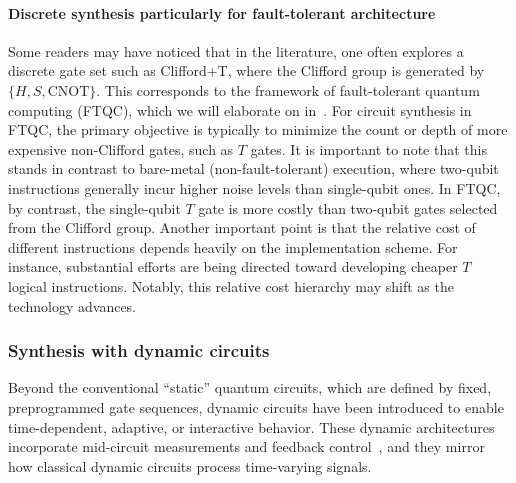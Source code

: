 \documentclass[a4paper,onecolumn,11pt,unpublished]{quantumarticle}
\begin{document}
\paragraph{Discrete synthesis particularly for fault-tolerant architecture}
Some readers may have noticed that in the literature, one often explores a discrete gate set such as Clifford+T, where the Clifford group is generated by $\{H, S, \text{CNOT}\}$. This corresponds to the framework of fault-tolerant quantum computing (FTQC), which we will elaborate on in~. For circuit synthesis in FTQC, the primary objective is typically to minimize the count or depth of more expensive non-Clifford gates, such as $T$ gates. It is important to note that this stands in contrast to bare-metal (non-fault-tolerant) execution, where two-qubit instructions generally incur higher noise levels than single-qubit ones. In FTQC, by contrast, the single-qubit $T$ gate is more costly than two-qubit gates selected from the Clifford group. Another important point is that the relative cost of different instructions depends heavily on the implementation scheme. For instance, substantial efforts are being directed toward developing cheaper $T$ logical instructions. Notably, this relative cost hierarchy may shift as the technology advances.

\subsubsection{Synthesis with dynamic circuits}

Beyond the conventional ``static'' quantum circuits, which are defined by fixed, preprogrammed gate sequences, dynamic circuits have been introduced to enable time-dependent, adaptive, or interactive behavior. These dynamic architectures incorporate mid-circuit measurements and feedback control~\cite{Corcoles2021Exploiting}, and they mirror how classical dynamic circuits process time-varying signals. 
\end{document}
